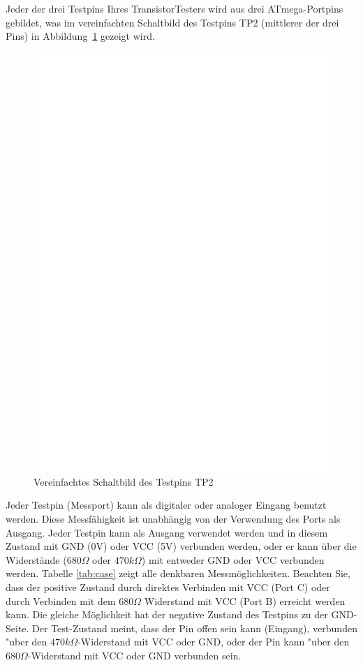 Jeder der drei Testpins Ihres TransistorTesters wird aus drei ATmega-Portpins gebildet,
was im vereinfachten Schaltbild des Testpins TP2 (mittlerer der drei Pins) in Abbildung~\ref{fig:terminal} gezeigt wird.

\begin{figure}[H]
\centering
\includegraphics[]{../FIG/terminal.eps}
\caption{Vereinfachtes Schaltbild des Testpins TP2}
\label{fig:terminal}
\end{figure}

Jeder Testpin (Messport) kann als digitaler oder analoger Eingang benutzt werden.
Diese Mess\-fähig\-keit ist un\-abhän\-gig von der Verwendung des Ports als Ausgang.
Jeder Testpin kann als Ausgang verwendet werden und in diesem Zustand mit GND (0V) oder VCC (5V) verbunden werden,
oder er kann über die Widerstände (\(680\Omega\) oder \(470k\Omega\)) mit entweder GND oder VCC verbunden werden.
Tabelle \ref{tab:case} zeigt alle denkbaren Messmöglichkeiten.
Beachten Sie, dass der positive Zustand durch direktes Verbinden mit VCC (Port C) oder
durch Verbinden mit dem \(680\Omega\) Widerstand mit VCC (Port B) erreicht werden kann.
Die gleiche Möglichkeit hat der negative Zustand des Testpins zu der GND-Seite.
Der Test-Zustand meint, dass der Pin offen sein kann (Eingang), verbunden "uber den \(470k\Omega\)-Widerstand
mit VCC oder GND, oder der Pin kann "uber den \(680\Omega\)-Widerstand mit VCC oder GND verbunden sein.

